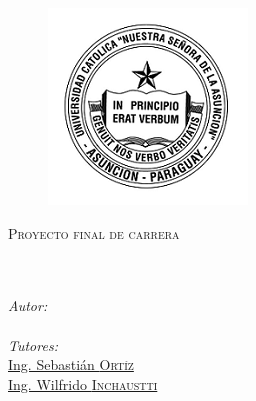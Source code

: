 \documentclass[
11pt, %
english, %
spanish,
singlespacing, %
liststotoc, %
parskip, %
headsepline, %
]{MastersDoctoralThesis} %
\author{Luis F. \textsc{Villalba V.}} %
\begin{document}
\frontmatter %
\pagestyle{plain} %


\begin{titlepage}
\begin{center}

\begin{figure}[H]
\centering
\includegraphics{Figuras/uca}
\decoRule
\end{figure}

{\scshape\LARGE \univname\par}\vspace{1.5cm} %
\textsc{\Large Proyecto final de carrera}\\[0.5cm] %

\HRule \\[0.4cm] %
{\huge \bfseries \ttitle\par}\vspace{0.4cm} %
\HRule \\[1cm] %

\Large \emph{Autor:}\\
\Large \href{}{\authorname} \\[5mm] %
\Large \emph{Tutores:}\\
\Large \href{}{Ing. Sebastián \textsc{Ortíz} \\ Ing. Wilfrido \textsc{Inchaustti}} \\[1cm]

\Large \facname\\ %
\Large \deptname \\[5mm]

{\large\the\year}\\[1cm] %

\end{center}
\end{titlepage}
\end{document}

